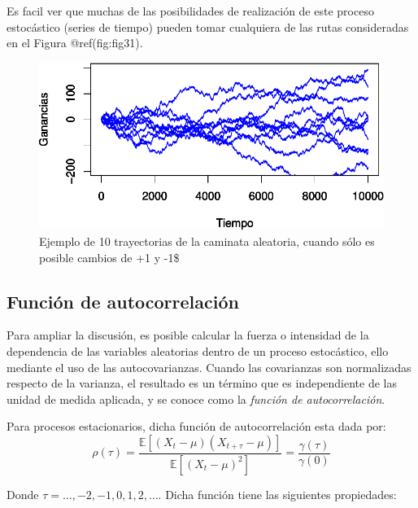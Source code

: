 \documentclass[
  a4paper,
]{article}
\begin{document}
Es facil ver que muchas de las posibilidades de realización de este
proceso estocástico (series de tiempo) pueden tomar cualquiera de las
rutas consideradas en el Figura @ref(fig:fig31).

\begin{figure}

\caption{Ejemplo de 10 trayectorias de la caminata aleatoria, cuando
sólo es posible cambios de +1 y -1\$}

{\centering \includegraphics{index_files/figure-pdf/fig31-1.pdf}

}

\end{figure}

\hypertarget{funciuxf3n-de-autocorrelaciuxf3n}{%
\subsection{Función de
autocorrelación}\label{funciuxf3n-de-autocorrelaciuxf3n}}

Para ampliar la discusión, es posible calcular la fuerza o intensidad de
la dependencia de las variables aleatorias dentro de un proceso
estocástico, ello mediante el uso de las autocovarianzas. Cuando las
covarianzas son normalizadas respecto de la varianza, el resultado es un
término que es independiente de las unidad de medida aplicada, y se
conoce como la \textit{función de autocorrelación}.

Para procesos estacionarios, dicha función de autocorrelación esta dada
por: \[
    \rho(\tau) = \frac{\mathbb{E}[(X_t - \mu)(X_{t+\tau} - \mu)]}{\mathbb{E}[(X_t - \mu)^2]} = \frac{\gamma(\tau)}{\gamma(0)} 
\]

Donde \(\tau = \ldots, -2, -1, 0, 1, 2, \ldots\). Dicha función tiene
las siguientes propiedades:
\end{document}
